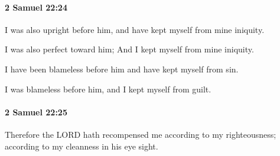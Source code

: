 		\paragraph{2 Samuel 22:24} %
			\label{2SAMUEL-22-24}

			I was also upright before him, and have kept myself from mine iniquity.

			\begin{versebox}
					\item[BHS] 
					\item[ASV] I was also perfect toward him; And I kept myself from mine iniquity.
					\item[NIV] I have been blameless before him and have kept myself from sin.
					\item[NRSV] I was blameless before him, and I kept myself from guilt.
			\end{versebox}

		\paragraph{2 Samuel 22:25} %
			\label{2SAMUEL-22-25}

			Therefore the LORD hath recompensed me according to my righteousness; according to my cleanness in his eye sight.

